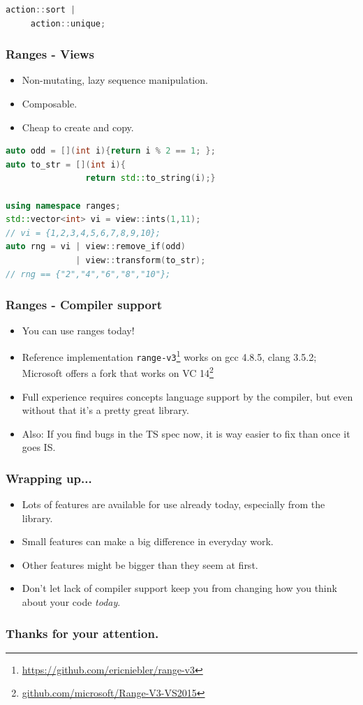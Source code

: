 \documentclass{beamer}
\begin{document}
\begin{frame}[fragile]
\begin{lstlisting}[language=C++,basicstyle=\ttfamily,keywordstyle=\color{blue},showstringspaces=false]
action::sort |
     action::unique;
    \end{lstlisting}
\end{frame}

\begin{frame}[fragile]
    \frametitle{Ranges - Views}
    \begin{itemize}
        \item Non-mutating, lazy sequence manipulation.
        \item Composable.
        \item Cheap to create and copy.
    \end{itemize}
    \begin{lstlisting}[language=C++,basicstyle=\ttfamily,keywordstyle=\color{blue},showstringspaces=false]
auto odd = [](int i){return i % 2 == 1; };
auto to_str = [](int i){
                return std::to_string(i);}

using namespace ranges;
std::vector<int> vi = view::ints(1,11);
// vi = {1,2,3,4,5,6,7,8,9,10};
auto rng = vi | view::remove_if(odd)
              | view::transform(to_str);
// rng == {"2","4","6","8","10"};
    \end{lstlisting}
\end{frame}

\begin{frame}
    \frametitle{Ranges - Compiler support}
    \begin{itemize}
        \item You can use ranges today!
        \item Reference implementation \texttt{range-v3}\footnote{\url{https://github.com/ericniebler/range-v3}} works on gcc 4.8.5, clang 3.5.2; Microsoft offers a fork that works on VC 14\footnote{\url{github.com/microsoft/Range-V3-VS2015}}
        \item Full experience requires concepts language support by the compiler, but even without that it's a pretty great library.
        \item Also: If you find bugs in the TS spec now, it is way easier to fix than once it goes IS.
    \end{itemize}
\end{frame}


\begin{frame}
    \frametitle{Wrapping up...}
    \begin{itemize}
        \item Lots of features are available for use already today, especially from the library.
        \item Small features can make a big difference in everyday work.
        \item Other features might be bigger than they seem at first.
        \item Don't let lack of compiler support keep you from changing how you think about your code \emph{today}.
    \end{itemize}
\end{frame}

\fi

\begin{frame}
  \frametitle{Thanks for your attention.}
\end{frame}
\end{document}
